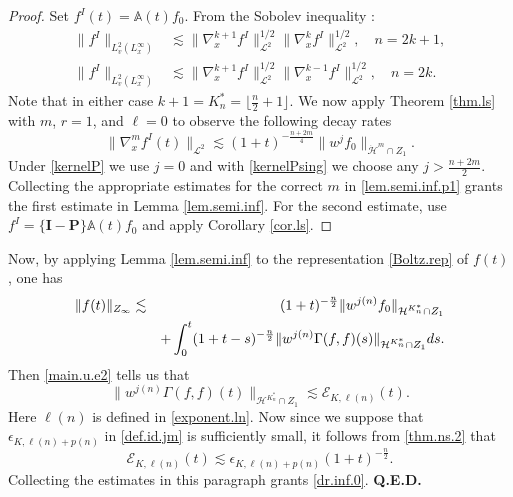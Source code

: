 \documentclass{amsart}
\numberwithin{equation}{section}
\begin{document}
\begin{proof}
Set ${f}^I(t)={\mathbb{A}} (t){f}_0$. From the Sobolev inequality \cite[Proposition
3.8]{MR1477408}:  
\begin{equation}\label{lem.semi.inf.p1}
\begin{split}
  \|{f}^I\|_{L^2_{v}(L^\infty_x)} 
  &\lesssim 
   \|{\nabla}_x^{k+1} {f}^I\|_{{\mathcal{L}}^2}^{1/2}\|{\nabla}_x^{k} {f}^I\|_{{\mathcal{L}}^2}^{1/2}, \quad
   {n} = 2k+1,
   \\
     \|{f}^I\|_{L^2_{v}(L^\infty_x)}
     &\lesssim 
   \|{\nabla}_x^{k+1} {f}^I\|_{{\mathcal{L}}^2}^{1/2}\|{\nabla}_x^{k-1} {f}^I\|_{{\mathcal{L}}^2}^{1/2},
   \quad
   {n} = 2k.
   \end{split}
\end{equation}
Note that in either case $k+1 = {K^*_n} = \lfloor \frac{n}{2} +1 \rfloor$.
We now apply Theorem \ref{thm.ls} with $m$, $r=1$, and ${\ell}=0$ to observe the following decay rates
\begin{equation*}
    \|{\nabla}_x^{m} {f}^I(t)\|_{{\mathcal{L}}^2}
    \lesssim
     (1+t)^{-\frac{{n}+2m}{4}} \|w^{j}{f}_0\|_{{{\dot{\mathcal{H}}}^{m}}\cap Z_1}.
\end{equation*}
Under \eqref{kernelP} we use ${j}=0$ and with \eqref{kernelPsing} we choose any ${j}>\frac{{n}+2m}{2}$.  
Collecting the appropriate estimates for the correct $m$ in \eqref{lem.semi.inf.p1} grants the first estimate in Lemma \ref{lem.semi.inf}.  For the second estimate, use ${f}^I=\{{\mathbf{I}} - {\mathbf{P}}\}{\mathbb{A}} (t){f}_0$ and apply Corollary \ref{cor.ls}.  
\end{proof}

Now, by applying Lemma \ref{lem.semi.inf} to the representation \eqref{Boltz.rep} of ${f}(t)$, one has
\begin{eqnarray}
 \nonumber 
  \|{f}(t)\|_{Z_\infty} &\lesssim &  (1+t)^{-\frac{n}{2}}\|w^{j({n})}{f}_0\|_{{\mathcal{H}}^{K^*_n}\cap Z_1}\\
  &&+\int_0^t(1+t-s)^{-\frac{n}{2}}\|w^{j({n})} {\Gamma}(f,f)(s)\|_{{\mathcal{H}}^{K^*_n}\cap Z_1} ds.
  \notag
\end{eqnarray}
Then \eqref{main.u.e2} tells us that 
\begin{equation*}
\|w^{j({n})} {\Gamma}(f,f)(t)\|_{{\mathcal{H}}^{K^*_n}\cap Z_1} \lesssim  {\mathcal{E}}_{{K},{\ell({n})}}(t).
\end{equation*}
Here ${\ell({n})}$ is defined in \eqref{exponent.ln}.  
Now since we suppose that ${\epsilon}_{{K},{\ell({n})}+{p({n})}}$ in \eqref{def.id.jm} is sufficiently small, it follows from \eqref{thm.ns.2} that  
\begin{equation*}
    {\mathcal{E}}_{{K},{\ell({n})}}(t)
    \lesssim
    {\epsilon}_{{K},{\ell({n})}+{p({n})}}(1+t)^{-\frac{n}{2}}.
\end{equation*}
Collecting the estimates in this paragraph grants  \eqref{dr.inf.0}.   \hfill {\bf Q.E.D.}
\end{document}
